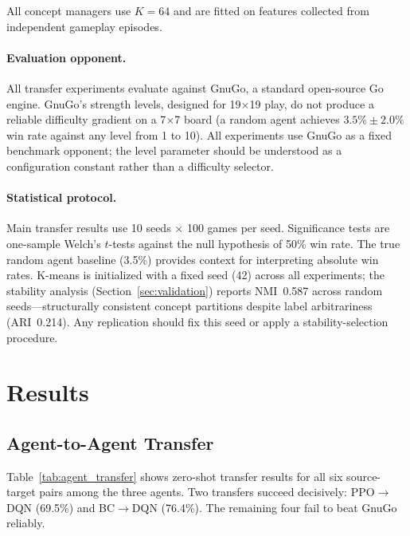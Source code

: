 \documentclass[11pt,a4paper]{article}
\begin{document}
All concept managers use $K=64$ and are fitted on features collected from independent gameplay episodes.

\paragraph{Evaluation opponent.} All transfer experiments evaluate against GnuGo, a standard open-source Go engine. GnuGo's strength levels, designed for 19$\times$19 play, do not produce a reliable difficulty gradient on a 7$\times$7 board (a random agent achieves $3.5\% \pm 2.0\%$ win rate against any level from 1 to 10). All experiments use GnuGo as a fixed benchmark opponent; the level parameter should be understood as a configuration constant rather than a difficulty selector.

\paragraph{Statistical protocol.} Main transfer results use 10 seeds $\times$ 100 games per seed. Significance tests are one-sample Welch's $t$-tests against the null hypothesis of 50\% win rate. The true random agent baseline (3.5\%) provides context for interpreting absolute win rates. K-means is initialized with a fixed seed (42) across all experiments; the stability analysis (Section~\ref{sec:validation}) reports NMI~0.587 across random seeds---structurally consistent concept partitions despite label arbitrariness (ARI~0.214). Any replication should fix this seed or apply a stability-selection procedure.

\section{Results}
\label{sec:results}

\subsection{Agent-to-Agent Transfer}
\label{sec:agent_transfer}

Table~\ref{tab:agent_transfer} shows zero-shot transfer results for all six source-target pairs among the three agents. Two transfers succeed decisively: PPO$\to$DQN (69.5\%) and BC$\to$DQN (76.4\%). The remaining four fail to beat GnuGo reliably.
\end{document}
